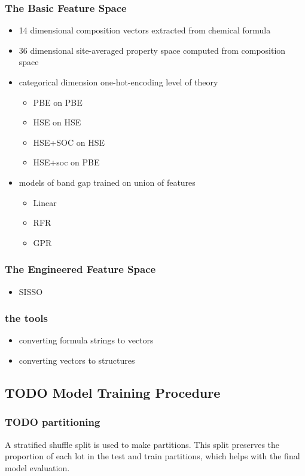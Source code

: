 \documentclass[aip, jmp, amsmath, amssymb]{revtex4-2}
\begin{document}
\subsubsection*{The Basic Feature Space}
\label{sec:org7ed947c}
\begin{itemize}
\item 14 dimensional composition vectors extracted from chemical formula
\item 36 dimensional site-averaged property space computed from composition space
\item categorical dimension one-hot-encoding level of theory
\begin{itemize}
\item PBE on PBE
\item HSE on HSE
\item HSE+SOC on HSE
\item HSE+soc on PBE
\end{itemize}
\item models of band gap trained on union of features
\begin{itemize}
\item Linear
\item RFR
\item GPR
\end{itemize}
\end{itemize}

\subsubsection*{The Engineered Feature Space}
\label{sec:orgcaded83}
\begin{itemize}
\item SISSO
\end{itemize}
\subsubsection*{the tools}
\label{sec:org6c13da6}
\begin{itemize}
\item converting formula strings to vectors
\item converting vectors to structures
\end{itemize}

\subsection*{{\bfseries\sffamily TODO} Model Training Procedure}
\label{sec:orgc33e34b}
\subsubsection*{{\bfseries\sffamily TODO} partitioning}
\label{sec:orgee9a8d2}
A stratified shuffle split is used to make partitions. This split
preserves the proportion of each \gls{lot} in the test and train
partitions, which helps with the final model evaluation.
\end{document}
